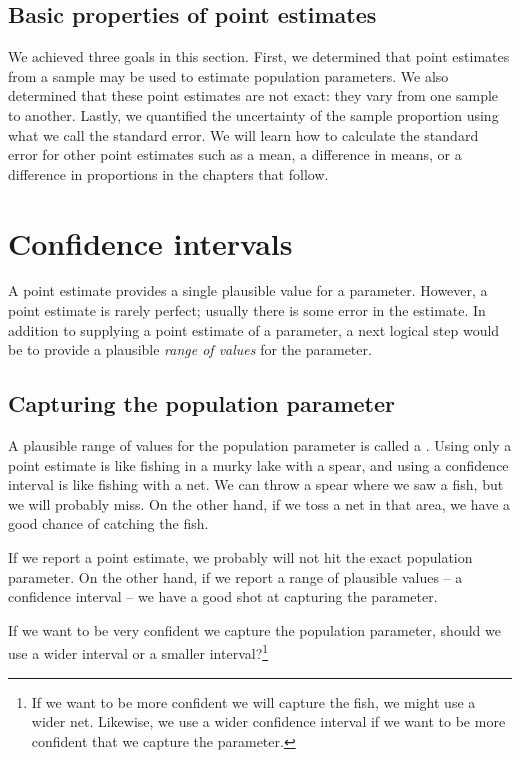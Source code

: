 \subsection{Basic properties of point estimates}

We achieved three goals in this section. First, we determined that point estimates from a sample may be used to estimate population parameters. We also determined that these point estimates are not exact: they vary from one sample to another. Lastly, we quantified the uncertainty of the sample proportion using what we call the standard error. We will learn how to calculate the standard error for other point estimates such as a mean, a difference in means, or a difference in proportions in the chapters that follow. 

\section[Confidence intervals]{Confidence intervals }
\label{ConfidenceIntervals}


A point estimate provides a single plausible value for a parameter. However, a point estimate is rarely perfect; usually there is some error in the estimate. In addition to supplying a point estimate of a parameter, a next logical step would be to provide a plausible \emph{range of values} for the parameter.


\subsection{Capturing the population parameter}

A plausible range of values for the population parameter is called a . Using only a point estimate is like fishing in a murky lake with a spear, and using a confidence interval is like fishing with a net. We can throw a spear where we saw a fish, but we will probably miss. On the other hand, if we toss a net in that area, we have a good chance of catching the fish.

If we report a point estimate, we probably will not hit the exact population parameter. On the other hand, if we report a range of plausible values -- a confidence interval -- we have a good shot at capturing the parameter.

\begin{exercise}
If we want to be very confident we capture the population parameter, should we use a wider interval or a smaller interval?\footnote{If we want to be more confident we will capture the fish, we might use a wider net. Likewise, we use a wider confidence interval if we want to be more confident that we capture the parameter.}
\end{exercise}


